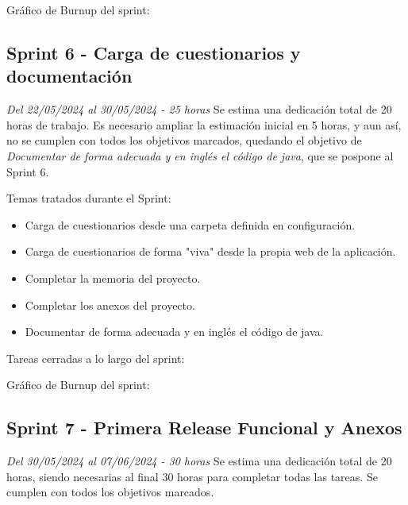 Gráfico de Burnup del sprint:


\clearpage
\subsection{Sprint 6 - Carga de cuestionarios y documentación}
\textit{Del 22/05/2024 al 30/05/2024 - 25 horas}
Se estima una dedicación total de 20 horas de trabajo.
Es necesario ampliar la estimación inicial en 5 horas, y aun así, no se cumplen con todos los objetivos marcados, quedando el objetivo de \textit{Documentar de forma adecuada y en inglés el código de java}, que se pospone al Sprint 6.

Temas tratados durante el Sprint:
\begin{itemize}
	\item
	Carga de cuestionarios desde una carpeta definida en configuración.
	\item
	Carga de cuestionarios de forma "viva" desde la propia web de la aplicación.
	\item
	Completar la memoria del proyecto.
	\item
	Completar los anexos del proyecto.
	\item
	Documentar de forma adecuada y en inglés el código de java.
\end{itemize}
\clearpage
Tareas cerradas a lo largo del sprint:

Gráfico de Burnup del sprint:

\clearpage
\subsection{Sprint 7 - Primera Release Funcional y Anexos}
\textit{Del 30/05/2024 al 07/06/2024 - 30 horas}
Se estima una dedicación total de 20 horas, siendo necesarias al final 30 horas para completar todas las tareas.
Se cumplen con todos los objetivos marcados.

